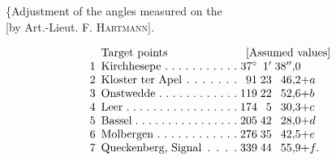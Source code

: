 \vspace*{2.8\baselineskip}
{\centering
[4.]\par\medskip
\{Adjustment of the angles measured on the \\
{[}by Art.-Lieut. F. \textsc{Hartmann}].\par}
\[
\begin{array}{@{}r@{\enspace}l@{\;}r@{\;}r@{\;}r@{}l@{}}
 &\text{Target points}&\multicolumn{4}{c@{}}{\text{[Assumed values]}}\\
 1&\text{\hbox to 12em{Kirchhesepe\hfil.\hfil.\hfil.\hfil.\hfil.\hfil.\hfil.\hfil.\hfil.\hfil.\hfil.}}&37^\circ&1'&38''{,}0&\\
 2&\text{\hbox to 12em{Kloster ter Apel\hfil.\hfil.\hfil.\hfil.\hfil.\hfil.\hfil.}}&91&23&46{,}2&+a\\
 3&\text{\hbox to 12em{Onstwedde\hfil.\hfil.\hfil.\hfil.\hfil.\hfil.\hfil.\hfil.\hfil.\hfil.\hfil.\hfil.}}&119&22&52{,}6&+b\\
 4&\text{\hbox to 12em{Leer\hfil.\hfil.\hfil.\hfil.\hfil.\hfil.\hfil.\hfil.\hfil.\hfil.\hfil.\hfil.\hfil.\hfil.\hfil.\hfil.\hfil.}}&174&5&30{,}3&+c\\
 5&\text{\hbox to 12em{Bassel\hfil.\hfil.\hfil.\hfil.\hfil.\hfil.\hfil.\hfil.\hfil.\hfil.\hfil.\hfil.\hfil.\hfil.\hfil.\hfil.}}&205&42&28{,}0&+d\\
 6&\text{\hbox to 12em{Molbergen\hfil.\hfil.\hfil.\hfil.\hfil.\hfil.\hfil.\hfil.\hfil.\hfil.\hfil.\hfil.}}&276&35&42{,}5&+e\\
 7&\text{\hbox to 12em{Queckenberg, Signal\hfil.\hfil.\hfil.\hfil.}}&339&44&55{,}9&+f.
\end{array}
\]
